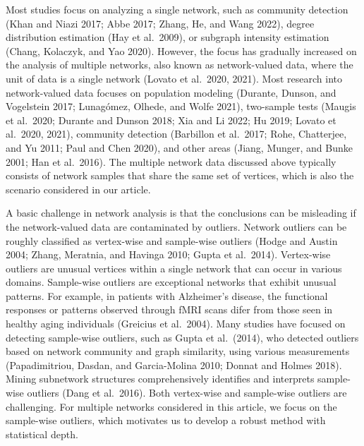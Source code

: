 \documentclass[
  10
]{article}
\begin{document}
Most studies focus on analyzing a single network, such as community
detection (Khan and Niazi 2017; Abbe 2017; Zhang, He, and Wang 2022),
degree distribution estimation (Hay et al.~2009), or subgraph intensity
estimation (Chang, Kolaczyk, and Yao 2020). However, the focus has
gradually increased on the analysis of multiple networks, also known as
network-valued data, where the unit of data is a single network (Lovato
et al.~2020, 2021). Most research into network-valued data focuses on
population modeling (Durante, Dunson, and Vogelstein 2017; Lunagómez,
Olhede, and Wolfe 2021), two-sample tests (Maugis et al.~2020; Durante
and Dunson 2018; Xia and Li 2022; Hu 2019; Lovato et al.~2020, 2021),
community detection (Barbillon et al.~2017; Rohe, Chatterjee, and Yu
2011; Paul and Chen 2020), and other areas (Jiang, Munger, and Bunke
2001; Han et al.~2016). The multiple network data discussed above
typically consists of network samples that share the same set of
vertices, which is also the scenario considered in our article.

A basic challenge in network analysis is that the conclusions can be
misleading if the network-valued data are contaminated by outliers.
Network outliers can be roughly classified as vertex-wise and
sample-wise outliers (Hodge and Austin 2004; Zhang, Meratnia, and
Havinga 2010; Gupta et al.~2014). Vertex-wise outliers are unusual
vertices within a single network that can occur in various domains.
Sample-wise outliers are exceptional networks that exhibit unusual
patterns. For example, in patients with Alzheimer's disease, the
functional responses or patterns observed through fMRI scans difer from
those seen in healthy aging individuals (Greicius et al.~2004). Many
studies have focused on detecting sample-wise outliers, such as Gupta et
al.~(2014), who detected outliers based on network community and graph
similarity, using various measurements (Papadimitriou, Dasdan, and
Garcia-Molina 2010; Donnat and Holmes 2018). Mining subnetwork
structures comprehensively identifies and interprets sample-wise
outliers (Dang et al.~2016). Both vertex-wise and sample-wise outliers
are challenging. For multiple networks considered in this article, we
focus on the sample-wise outliers, which motivates us to develop a
robust method with statistical depth.
\end{document}
